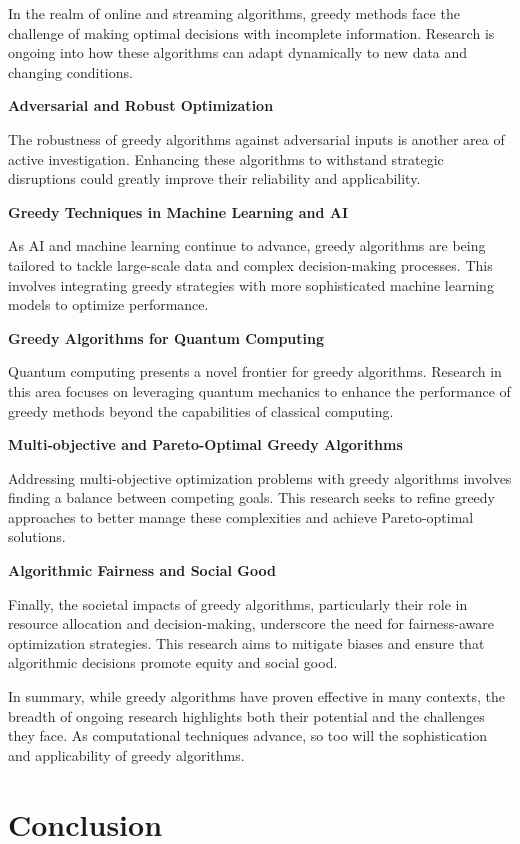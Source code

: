 \documentclass[12pt]{book} %
\begin{document}
In the realm of online and streaming algorithms, greedy methods face the challenge of making optimal decisions with incomplete information. Research is ongoing into how these algorithms can adapt dynamically to new data and changing conditions.

\textbf{Adversarial and Robust Optimization}

The robustness of greedy algorithms against adversarial inputs is another area of active investigation. Enhancing these algorithms to withstand strategic disruptions could greatly improve their reliability and applicability.

\textbf{Greedy Techniques in Machine Learning and AI}

As AI and machine learning continue to advance, greedy algorithms are being tailored to tackle large-scale data and complex decision-making processes. This involves integrating greedy strategies with more sophisticated machine learning models to optimize performance.

\textbf{Greedy Algorithms for Quantum Computing}

Quantum computing presents a novel frontier for greedy algorithms. Research in this area focuses on leveraging quantum mechanics to enhance the performance of greedy methods beyond the capabilities of classical computing.

\textbf{Multi-objective and Pareto-Optimal Greedy Algorithms}

Addressing multi-objective optimization problems with greedy algorithms involves finding a balance between competing goals. This research seeks to refine greedy approaches to better manage these complexities and achieve Pareto-optimal solutions.

\textbf{Algorithmic Fairness and Social Good}

Finally, the societal impacts of greedy algorithms, particularly their role in resource allocation and decision-making, underscore the need for fairness-aware optimization strategies. This research aims to mitigate biases and ensure that algorithmic decisions promote equity and social good.

In summary, while greedy algorithms have proven effective in many contexts, the breadth of ongoing research highlights both their potential and the challenges they face. As computational techniques advance, so too will the sophistication and applicability of greedy algorithms.

\section{Conclusion}
\end{document}
